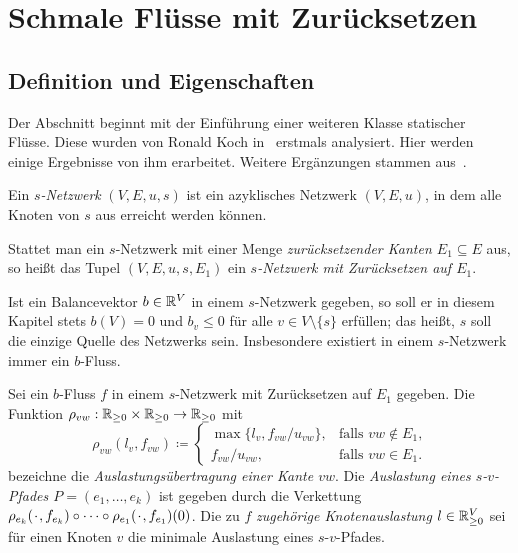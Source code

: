 \chapter{Schmale Flüsse mit Zurücksetzen}\label{chapter-thin-flows}
\newcommand*{\PlH}{\makebox[1ex]{\textbf{$\cdot$}}}

\section{Definition und Eigenschaften}

Der Abschnitt beginnt mit der Einführung einer weiteren Klasse statischer Flüsse.
Diese wurden von Ronald Koch in~\cite{Koch2012} erstmals analysiert.
Hier werden einige Ergebnisse von ihm erarbeitet.
Weitere Ergänzungen stammen aus~\cite{Cominetti2015}.

\begin{definition}[$s$-Netzwerk]
	Ein \emph{$s$-Netzwerk} $(V, E, u, s)$ ist ein azyklisches Netzwerk $(V, E, u)$, in dem alle Knoten von $s$ aus erreicht werden können.

	 Stattet man ein $s$-Netzwerk mit einer Menge \emph{zurücksetzender Kanten $E_1\subseteq E$} aus, so heißt das Tupel $(V, E, u, s, E_1)$ ein \emph{$s$-Netzwerk mit Zurücksetzen auf $E_1$}.
\end{definition}

Ist ein Balancevektor $b\in\mathbb{R}^V$ in einem $s$-Netzwerk gegeben, so soll er in diesem Kapitel stets $b(V) = 0$ und $b_v\leq 0$ für alle $v\in V\setminus \{ s \}$ erfüllen; das heißt, $s$ soll die einzige Quelle des Netzwerks sein.
Insbesondere existiert in einem $s$-Netzwerk immer ein $b$-Fluss.



\begin{definition}
	Sei ein $b$-Fluss $f$ in einem $s$-Netzwerk mit Zurück\-setzen auf $E_1$ gegeben.
	Die Funktion $\rho_{vw}: \mathbb{R}_{\geq 0}\times \mathbb{R}_{\geq 0} \to \mathbb{R}_{\geq 0}$  mit \[ \rho_{vw}(l_v, f_{vw}) \coloneq \begin{cases}
		\max\{ l_v, f_{vw} / u_{vw} \}, & \text{falls $vw\notin E_1$,}\\
		f_{vw} / u_{vw}, & \text{falls $vw\in E_1$.}
	\end{cases}
	\]
	bezeichne die \emph{Auslastungsübertragung einer Kante $vw$}.
	Die \emph{Auslastung eines $s$-$v$-Pfades $P=(e_1,\dots,e_k)$} ist gegeben durch die Verkettung $\rho_{e_k}(\PlH, f_{e_k})\circ \dots \circ \rho_{e_1}(\PlH, f_{e_1})(0)$.
	Die zu $f$ \emph{zugehörige Knotenauslastung $l\in\mathbb{R}_{\geq 0}^V$} sei für einen Knoten $v$ die minimale Auslastung eines $s$-$v$-Pfades.
\end{definition}


